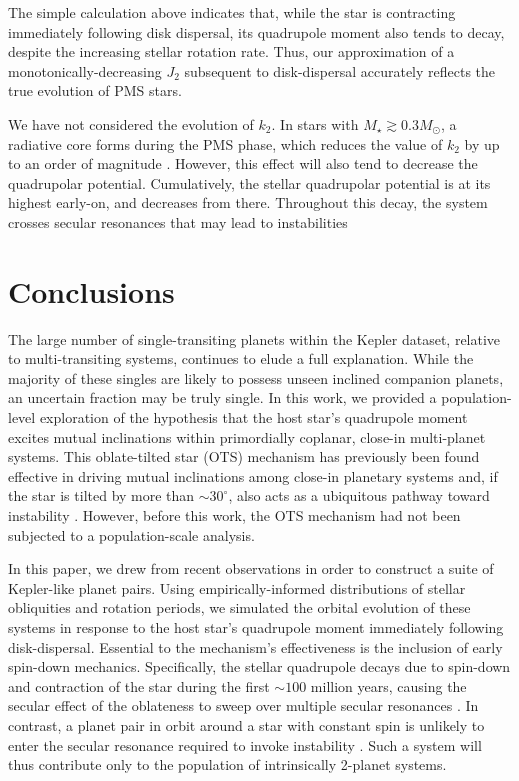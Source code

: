 \documentclass[twocolumn]{aastex63}
\begin{document}
The simple calculation above indicates that, while the star is contracting immediately following disk dispersal, its quadrupole moment also tends to decay, despite the increasing stellar rotation rate. Thus, our approximation of a monotonically-decreasing $J_2$ subsequent to disk-dispersal accurately reflects the true evolution of PMS stars. 

We have not considered the evolution of $k_2$. In stars with $M_\star\gtrsim0.3 M_\odot$, a radiative core forms during the PMS phase, which reduces the value of $k_2$ by up to an order of magnitude \citep{batygin2013magnetic}. However, this effect will also tend to decrease the quadrupolar potential. Cumulatively, the stellar quadrupolar potential is at its highest early-on, and decreases from there. Throughout this decay, the system crosses secular resonances that may lead to instabilities \citep{Ward1981solar,spalding2018resilience}

\section{Conclusions}\label{sec: Conclusions}

The large number of single-transiting planets within the Kepler dataset, relative to multi-transiting systems, continues to elude a full explanation. While the majority of these singles are likely to possess unseen inclined companion planets, an uncertain fraction may be truly single. In this work, we provided a population-level exploration of the hypothesis that the host star's quadrupole moment excites mutual inclinations within primordially coplanar, close-in multi-planet systems. This oblate-tilted star (OTS) mechanism has previously been found effective in driving mutual inclinations among close-in planetary systems \citep{spalding2016spin,li2020mutual} and, if the star is tilted by more than $\sim 30^\circ$, also acts as a ubiquitous pathway toward instability \citep{spalding2018resilience}. However, before this work, the OTS mechanism had not been subjected to a population-scale analysis.


In this paper, we drew from recent observations in order to construct a suite of Kepler-like planet pairs. Using empirically-informed distributions of stellar obliquities and rotation periods, we simulated the orbital evolution of these systems in response to the host star's quadrupole moment immediately following disk-dispersal. Essential to the mechanism's effectiveness is the inclusion of early spin-down mechanics. Specifically, the stellar quadrupole decays due to spin-down and contraction of the star during the first $\sim100$ million years, causing the secular effect of the oblateness to sweep over multiple secular resonances \citep{Ward1981solar}. In contrast, a planet pair in orbit around a star with constant spin is unlikely to enter the secular resonance required to invoke instability \citep{spalding2018resilience}. Such a system will thus contribute only to the population of intrinsically 2-planet systems. 
\end{document}
